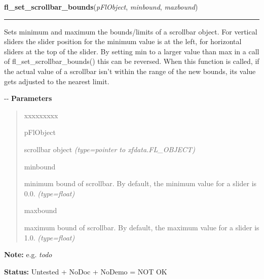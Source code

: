 \hspace{.8\funcindent}\begin{boxedminipage}{\funcwidth}

    \raggedright \textbf{fl\_set\_scrollbar\_bounds}(\textit{pFlObject}, \textit{minbound}, \textit{maxbound})

    \vspace{-1.5ex}

    \rule{\textwidth}{0.5\fboxrule}
\setlength{\parskip}{2ex}

Sets minimum and maximum the bounds/limits of a scrollbar object. For
vertical sliders the slider position for the minimum value is at the left,
for horizontal sliders at the top of the slider. By setting min to a
larger value than max in a call of fl\_set\_scrollbar\_bounds() this can be
reversed. When this function is called, if the actual value of a scrollbar
isn't within the range of the new bounds, its value gets adjusted to the
nearest limit.

-{}-
\setlength{\parskip}{1ex}
      \textbf{Parameters}
      \vspace{-1ex}

      \begin{quote}
        \begin{Ventry}{xxxxxxxxx}

          \item[pFlObject]


scrollbar object
            {\it (type=pointer to xfdata.FL\_OBJECT)}

          \item[minbound]


minimum bound of scrollbar. By default, the minimum value
for a slider is 0.0.
            {\it (type=float)}

          \item[maxbound]


maximum bound of scrollbar. By default, the maximum value
for a slider is 1.0.
            {\it (type=float)}

        \end{Ventry}

      \end{quote}

\textbf{Note:} 
e.g. \emph{todo}


\textbf{Status:} 
Untested + NoDoc + NoDemo = NOT OK


    \end{boxedminipage}

    \label{xformslib:flscrollbar:fl_get_scrollbar_bounds}

